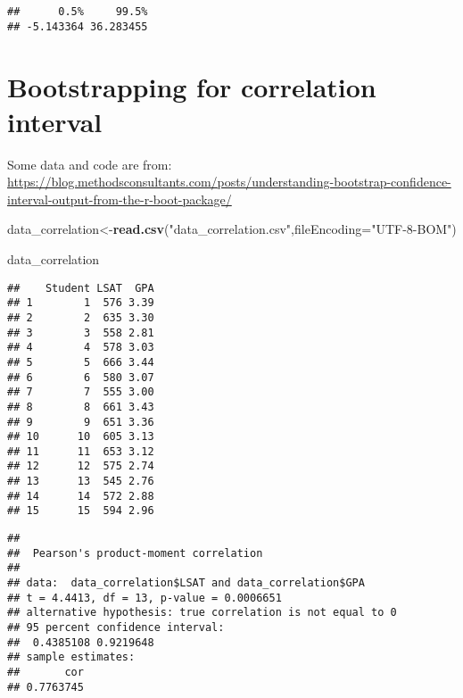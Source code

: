 \documentclass[]{book}
\newenvironment{Shaded}{\begin{snugshade}}{\end{snugshade}}
\newcommand{\DataTypeTok}[1]{\textcolor[rgb]{0.13,0.29,0.53}{#1}}
\newcommand{\KeywordTok}[1]{\textcolor[rgb]{0.13,0.29,0.53}{\textbf{#1}}}
\newcommand{\NormalTok}[1]{#1}
\newcommand{\OperatorTok}[1]{\textcolor[rgb]{0.81,0.36,0.00}{\textbf{#1}}}
\newcommand{\StringTok}[1]{\textcolor[rgb]{0.31,0.60,0.02}{#1}}
\begin{document}
\begin{verbatim}
##      0.5%     99.5% 
## -5.143364 36.283455
\end{verbatim}

\hypertarget{bootstrapping-for-correlation-interval}{%
\section{Bootstrapping for correlation interval}\label{bootstrapping-for-correlation-interval}}

Some data and code are from: \url{https://blog.methodsconsultants.com/posts/understanding-bootstrap-confidence-interval-output-from-the-r-boot-package/}

\begin{Shaded}
\begin{Highlighting}[]
\NormalTok{data_correlation<-}\KeywordTok{read.csv}\NormalTok{(}\StringTok{"data_correlation.csv"}\NormalTok{,}\DataTypeTok{fileEncoding=}\StringTok{"UTF-8-BOM"}\NormalTok{)}

\NormalTok{data_correlation}
\end{Highlighting}
\end{Shaded}

\begin{verbatim}
##    Student LSAT  GPA
## 1        1  576 3.39
## 2        2  635 3.30
## 3        3  558 2.81
## 4        4  578 3.03
## 5        5  666 3.44
## 6        6  580 3.07
## 7        7  555 3.00
## 8        8  661 3.43
## 9        9  651 3.36
## 10      10  605 3.13
## 11      11  653 3.12
## 12      12  575 2.74
## 13      13  545 2.76
## 14      14  572 2.88
## 15      15  594 2.96
\end{verbatim}

\begin{Shaded}
\end{Shaded}

\begin{verbatim}
## 
##  Pearson's product-moment correlation
## 
## data:  data_correlation$LSAT and data_correlation$GPA
## t = 4.4413, df = 13, p-value = 0.0006651
## alternative hypothesis: true correlation is not equal to 0
## 95 percent confidence interval:
##  0.4385108 0.9219648
## sample estimates:
##       cor 
## 0.7763745
\end{verbatim}
\end{document}
